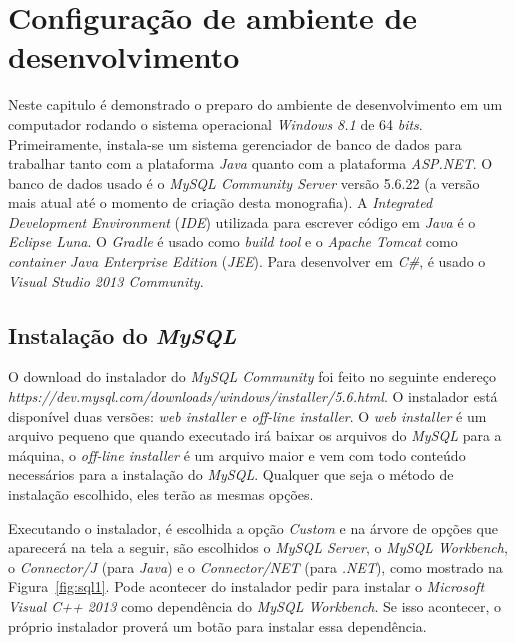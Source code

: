 \chapter{Configuração de ambiente de desenvolvimento}

Neste capitulo é demonstrado o preparo do ambiente de desenvolvimento em um computador rodando o sistema operacional \textit{Windows 8.1} de 64 \textit{bits}. Primeiramente, instala-se um sistema gerenciador de banco de dados para trabalhar tanto com a plataforma \textit{Java} quanto com a plataforma \textit{ASP.NET}.  O banco de dados usado é o \textit{MySQL Community Server} versão 5.6.22 (a versão mais atual até o momento de criação desta monografia). A \textit{Integrated Development Environment} (\textit{IDE}) utilizada  para escrever código em \textit{Java} é o \textit{Eclipse Luna}. O \textit{Gradle} é usado como \textit{build tool} e o \textit{Apache Tomcat} como \textit{container Java Enterprise Edition} (\textit{JEE}). Para desenvolver em \textit{C\#}, é usado o \textit{Visual Studio 2013 Community}.  

\section{Instalação do \textit{MySQL}}

O download do instalador do \textit{MySQL Community} foi feito no seguinte endereço \textit{https://dev.mysql.com/downloads/windows/installer/5.6.html}. O instalador está disponível duas versões: \textit{web installer} e \textit{off-line installer}. O \textit{web installer} é um arquivo pequeno que quando executado irá baixar os arquivos do \textit{MySQL} para a máquina, o \textit{off-line installer} é um arquivo maior e vem com todo conteúdo necessários para a  instalação do \textit{MySQL}. Qualquer que seja o método de instalação escolhido, eles terão as mesmas opções.

Executando o instalador, é escolhida a opção \textit{Custom} e na árvore de opções que aparecerá na tela a seguir, são escolhidos o \textit{MySQL Server}, o \textit{MySQL Workbench}, o \textit{Connector/J} (para \textit{Java}) e o \textit{Connector/NET} (para \textit{.NET}), como mostrado na Figura~\ref{fig:sql1}. Pode acontecer do instalador pedir para instalar o \textit{Microsoft Visual C++ 2013} como dependência do \textit{MySQL Workbench}. Se isso acontecer, o próprio instalador proverá um botão para instalar essa dependência.


